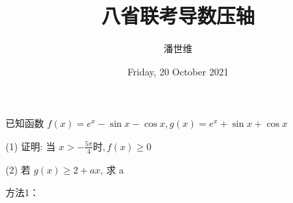 \documentclass[a4paper,12pt]{article}
\begin{document}
\title {八省联考导数压轴}
\author{潘世维}
\date{Friday, 20 October 2021}
\maketitle

已知函数 $ f(x)=e^{x}-\sin x-\cos x, g(x)=e^{x}+\sin x+\cos x$


(1) 证明: 当 $ x>-\frac{5 \pi}{4}  时,  f(x) \geq 0 $



(2) 若 $ g(x) \geq 2+a x $, 求  a 
\par{}

方法1：
\end{document}
